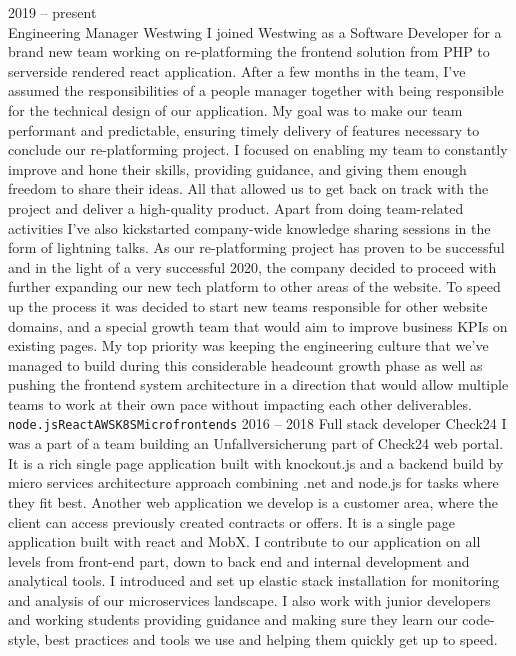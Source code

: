 \documentclass[9pt]{developercv} %
\begin{document}
\begin{entrylist}
	\entry
		{2019 -- present\\}
		{Engineering Manager}
		{Westwing}
		{I joined Westwing as a Software Developer for a brand new team working on re-platforming the frontend solution from PHP to serverside rendered react application. After a few months in the team, I've assumed the responsibilities of a people manager together with being responsible for the technical design of our application. My goal was to make our team performant and predictable, ensuring timely delivery of features necessary to conclude our re-platforming project.  I focused on enabling my team to constantly improve and hone their skills, providing guidance, and giving them enough freedom to share their ideas. All that allowed us to get back on track with the project and deliver a high-quality product. Apart from doing team-related activities I've also kickstarted company-wide knowledge sharing sessions in the form of lightning talks. As our re-platforming project has proven to be successful and in the light of a very successful 2020, the company decided to proceed with further expanding our new tech platform to other areas of the website. To speed up the process it was decided to start new teams responsible for other website domains, and a special growth team that would aim to improve business KPIs on existing pages.
		My top priority was keeping the engineering culture that we've managed to build during this considerable headcount growth phase as well as pushing the frontend system architecture in a direction that would allow multiple teams to work at their own pace without impacting each other deliverables.
		\\ \texttt{node.js}\slashsep\texttt{React}\slashsep\texttt{AWS}\slashsep\texttt{K8S}\slashsep\texttt{Microfrontends}}
	\entry
		{2016 -- 2018}
		{Full stack developer}
		{Check24}
		{I was a part of a team building an Unfallversicherung part of Check24 web portal. It is a rich single page application built with knockout.js and a backend build by micro services architecture approach combining .net and node.js for tasks where they fit best. Another web application we develop is a customer area, where the client can access previously created contracts or offers. It is a single page application built with react and MobX. I contribute to our application on all levels from front-end part, down to back end and internal development and analytical tools. I introduced and set up elastic stack installation for monitoring and analysis of our microservices landscape. I also work with junior developers and working students providing guidance and making sure they learn our code-style, best practices and tools we use and helping them quickly get up to speed.
}
\end{entrylist}
\end{document}
